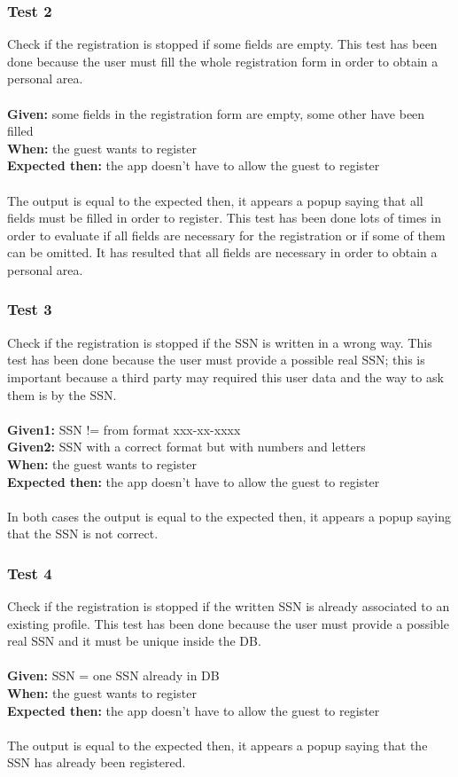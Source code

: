 \subsubsection{\Large{Test 2}}
Check if the registration is stopped if some fields are empty. This test has been done because the user must fill the whole registration form in order to obtain a personal area.\\
\\
\textbf{Given: } some fields in the registration form are empty, some other have been filled\\
\textbf{When: } the guest wants to register\\
\textbf{Expected then: } the app doesn't have to allow the guest to register\\
\\
The output is equal to the expected then, it appears a popup saying that all fields must be filled in order to register. This test has been done lots of times in order to evaluate if all fields are necessary for the registration or if some of them can be omitted. It has resulted that all fields are necessary in order to obtain a personal area.

\subsubsection{\Large{Test 3}}
Check if the registration is stopped if the SSN is written in a wrong way. This test has been done because the user must provide a possible real SSN; this is important because a third party may required this user data and the way to ask them is by the SSN.\\
\\
\textbf{Given1: } SSN != from format xxx-xx-xxxx \\
\textbf{Given2: } SSN with a correct format but with numbers and letters\\
\textbf{When: } the guest wants to register\\
\textbf{Expected then: } the app doesn't have to allow the guest to register\\
\\
In both cases the output is equal to the expected then, it appears a popup saying that the SSN is not correct.

\subsubsection{\Large{Test 4}}
Check if the registration is stopped if the written SSN is already associated to an existing profile. This test has been done because the user must provide a possible real SSN and it must be unique inside the DB.\\
\\
\textbf{Given: } SSN = one SSN already in DB\\
\textbf{When: } the guest wants to register\\
\textbf{Expected then: } the app doesn't have to allow the guest to register\\
\\
The output is equal to the expected then, it appears a popup saying that the SSN has already been registered.

